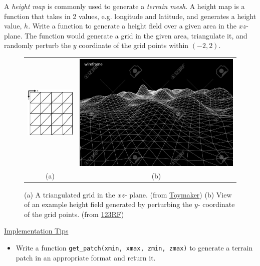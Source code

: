 \documentclass[addpoints]{exam}
\begin{document}
\begin{questions}


  A \textit{height map} is commonly used to generate a \textit{terrain mesh}. A height map is a function that takes in 2 values, e.g. longitude and latitude, and generates a height value, $h$. Write a function to generate a height field over a given area in the $xz$- plane. The function would generate a grid in the given area, triangulate it, and randomly perturb the $y$ coordinate of the grid points within $(-2, 2)$.
  \begin{figure}[!h]
    \centering
    \begin{tabular}{cc}
      \includegraphics[height=.35\textwidth]{terrain1}
      & \includegraphics[height=.35\textwidth]{terrain2}\\
      (a) & (b)
    \end{tabular}
    \caption{(a) A triangulated grid in the $xz$- plane. (from \href{http://keithditch.powweb.com/Games/XNA/html/xna\_terrain.html}{Toymaker}) (b) View of an example height field generated by perturbing the $y$- coordinate of the grid points. (from \href{https://www.123rf.com/photo_54102307_stock-vector-3d-wireframe-terrain-contour-vector.html}{123RF})}
  \end{figure}
  
  \noindent\underline{Implementation Tips}
  \begin{itemize}
  \item Write a function \texttt{get\_patch(xmin, xmax, zmin, zmax)} to generate a terrain patch in an appropriate format and return it.
  \end{itemize}


\end{questions}
\end{document}
